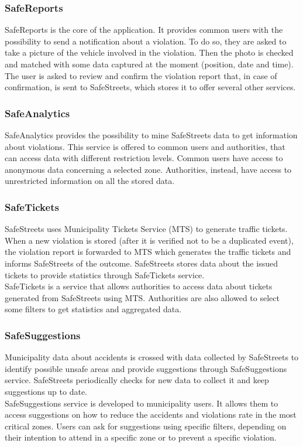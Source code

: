 \documentclass[a4paper]{article}
\begin{document}
\subsubsection{SafeReports}

SafeReports is the core of the application. It provides common users
with the possibility to send a notification about a violation. To do so,
they are asked to take a picture of the vehicle involved in the
violation. Then the photo is checked and matched with some data captured
at the moment (position, date and time). The user is asked to review and
confirm the violation report that, in case of confirmation, is sent to
SafeStreets, which stores it to offer several other services.

\subsubsection{SafeAnalytics}

SafeAnalytics provides the possibility to mine SafeStreets data to get
information about violations. This service is offered to common users
and authorities, that can access data with different restriction levels.
Common users have access to anonymous data concerning a selected zone.
Authorities, instead, have access to unrestricted information on all the
stored data.

\subsubsection{SafeTickets}

SafeStreets uses Municipality Tickets Service (MTS) to generate traffic
tickets. When a new violation is stored (after it is verified not to be
a duplicated event), the violation report is forwarded to MTS which
generates the traffic tickets and informs SafeStreets of the outcome.
SafeStreets stores data about the issued tickets to provide statistics
through SafeTickets service.\\
SafeTickets is a service that allows authorities to access data about
tickets generated from SafeStreets using MTS. Authorities are also
allowed to select some filters to get statistics and aggregated data.

\subsubsection{SafeSuggestions}

Municipality data about accidents is crossed with data collected by
SafeStreets to identify possible unsafe areas and provide suggestions
through SafeSuggestions service. SafeStreets periodically checks for new
data to collect it and keep suggestions up to date.\\
SafeSuggestions service is developed to municipality users. It allows
them to access suggestions on how to reduce the accidents and violations
rate in the most critical zones. Users can ask for suggestions using
specific filters, depending on their intention to attend in a specific
zone or to prevent a specific violation.
\end{document}
